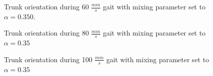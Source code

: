 				\begin{figure}
					\centering
					\caption{Trunk orientation during 60 $\frac{mm}{s}$ gait with mixing parameter set to $\alpha = 0.350$.}
					\label{fig::narx60_a350_nne}
				\end{figure}
				\begin{figure}[!h]
					\centering
					\caption{Trunk orientation during 80 $\frac{mm}{s}$ gait with mixing  parameter set to $\alpha = 0.35$}
					\label{fig::narx80_a35}
				\end{figure}
				\begin{figure}[!h]
					\centering
					\caption{Trunk orientation during 100 $\frac{mm}{s}$ gait with mixing parameter set to $\alpha = 0.35$} 
					\label{fig::narx100_a35}
				\end{figure}